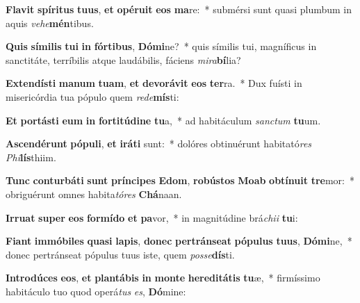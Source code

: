\item \textbf{Fla}\textbf{vit} \textbf{spí}\textbf{ri}\textbf{tus} \textbf{tu}\textbf{us}, \textbf{et} \textbf{o}\textbf{pé}\textbf{ru}\textbf{it} \textbf{e}\textbf{os} \textbf{ma}re:~* submérsi sunt quasi plumbum in aquis \textit{ve}\textit{he}\textbf{mén}tibus.
\item \textbf{Quis} \textbf{sí}\textbf{mi}\textbf{lis} \textbf{tu}\textbf{i} \textbf{in} \textbf{fór}\textbf{ti}\textbf{bus}, \textbf{Dó}\textbf{mi}ne?~* quis símilis tui, magníficus in sanctitáte, terríbilis atque laudábilis, fáciens \textit{mi}\textit{ra}\textbf{bí}lia?
\item \textbf{Ex}\textbf{ten}\textbf{dís}\textbf{ti} \textbf{ma}\textbf{num} \textbf{tu}\textbf{am}, \textbf{et} \textbf{de}\textbf{vo}\textbf{rá}\textbf{vit} \textbf{e}\textbf{os} \textbf{ter}ra.~* Dux fuísti in misericórdia tua pópulo quem \textit{red}\textit{e}\textbf{mís}ti:
\item \textbf{Et} \textbf{por}\textbf{tás}\textbf{ti} \textbf{e}\textbf{um} \textbf{in} \textbf{for}\textbf{ti}\textbf{tú}\textbf{di}\textbf{ne} \textbf{tu}a,~* ad habitáculum \textit{sanc}\textit{tum} \textbf{tu}um.
\item \textbf{A}\textbf{scen}\textbf{dé}\textbf{runt} \textbf{pó}\textbf{pu}\textbf{li}, \textbf{et} \textbf{i}\textbf{rá}\textbf{ti} sunt:~* dolóres obtinuérunt habitató\textit{res} \textit{Phi}\textbf{lís}thiim.
\item \textbf{Tunc} \textbf{con}\textbf{tur}\textbf{bá}\textbf{ti} \textbf{sunt} \textbf{prín}\textbf{ci}\textbf{pes} \textbf{E}\textbf{dom}, \textbf{ro}\textbf{bús}\textbf{tos} \textbf{Mo}\textbf{ab} \textbf{ob}\textbf{tí}\textbf{nu}\textbf{it} \textbf{tre}mor:~* obriguérunt omnes habita\textit{tó}\textit{res} \textbf{Chá}naan.
\item \textbf{Ir}\textbf{ru}\textbf{at} \textbf{su}\textbf{per} \textbf{e}\textbf{os} \textbf{for}\textbf{mí}\textbf{do} \textbf{et} \textbf{pa}vor,~* in magnitúdine brá\textit{chi}\textit{i} \textbf{tu}i:
\item \textbf{Fi}\textbf{ant} \textbf{im}\textbf{mó}\textbf{bi}\textbf{les} \textbf{qua}\textbf{si} \textbf{la}\textbf{pis}, \textbf{do}\textbf{nec} \textbf{per}\textbf{tráns}\textbf{e}\textbf{at} \textbf{pó}\textbf{pu}\textbf{lus} \textbf{tu}\textbf{us}, \textbf{Dó}\textbf{mi}ne,~* donec pertránseat pópulus tuus iste, quem \textit{pos}\textit{se}\textbf{dís}ti.
\item \textbf{In}\textbf{tro}\textbf{dú}\textbf{ces} \textbf{e}\textbf{os}, \textbf{et} \textbf{plan}\textbf{tá}\textbf{bis} \textbf{in} \textbf{mon}\textbf{te} \textbf{he}\textbf{re}\textbf{di}\textbf{tá}\textbf{tis} \textbf{tu}æ,~* firmíssimo habitáculo tuo quod operá\textit{tus} \textit{es}, \textbf{Dó}mine:

